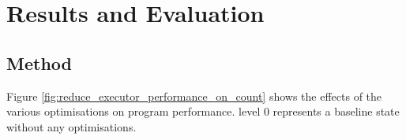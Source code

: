 \chapter{Results and Evaluation} \label{C:results}

\section{Method}




Figure \ref{fig:reduce_executor_performance_on_count} shows the effects of the various optimisations on program performance. level 0 represents a baseline state without any optimisations.

